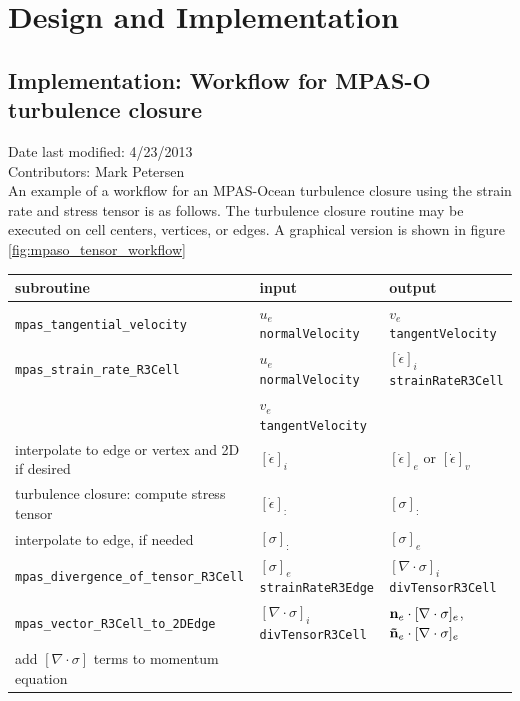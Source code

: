 \documentclass[11pt]{report}
\begin{document}

\chapter{Design and Implementation}

\section{Implementation: Workflow for MPAS-O turbulence closure}
Date last modified: 4/23/2013 \\
Contributors: Mark Petersen \\

An example of a workflow for an MPAS-Ocean turbulence closure using the strain rate and stress tensor is as follows.  The turbulence closure routine may be executed on cell centers, vertices, or edges.  A graphical version is shown in figure \ref{fig:mpaso_tensor_workflow}
\\
\begin{tabular}{ |l| l| l| }
\hline
  {\bf subroutine} &  {\bf input} &  {\bf output} \\
\hline
\verb|mpas_tangential_velocity|  & $u_e$ \verb|normalVelocity| & $v_e$ \verb|tangentVelocity|  \\
\verb|mpas_strain_rate_R3Cell|   & $u_e$ \verb|normalVelocity| & $\left[\dot\epsilon  \right]_i$ \verb|strainRateR3Cell|\\
&  $v_e$ \verb|tangentVelocity| &\\
interpolate to edge or vertex and 2D if desired &  $\left[\dot\epsilon  \right]_i$ &  $\left[\dot\epsilon  \right]_e$ or $\left[\dot\epsilon  \right]_v$\\
turbulence closure: compute stress tensor &  $\left[\dot\epsilon  \right]_:$ &  $\left[\sigma  \right]_:$\\
interpolate to edge, if needed   & $\left[\sigma  \right]_:$&  $\left[\sigma  \right]_e$\\
\verb|mpas_divergence_of_tensor_R3Cell|   &  $\left[\sigma  \right]_e$ \verb|strainRateR3Edge|& $[\nabla \cdot \sigma]_{i}$ \verb|divTensorR3Cell|\\
\verb|mpas_vector_R3Cell_to_2DEdge|  &  $[\nabla \cdot \sigma]_{i}$ \verb|divTensorR3Cell| & ${\bf n}_e\cdot[\nabla \cdot \sigma]_{e}$, ${\bf \tilde n}_e\cdot[\nabla \cdot \sigma]_{e}$ \\
add $[\nabla \cdot \sigma]$ terms to momentum equation & & \\
\hline
\end{tabular}
\end{document}
